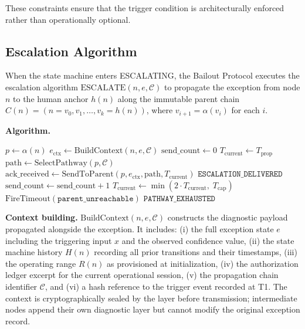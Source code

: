 These constraints ensure that the trigger condition is architecturally enforced rather than operationally optional.

\subsection{Escalation Algorithm}\label{sec:escalation-algorithm}

When the state machine enters ESCALATING, the Bailout Protocol executes the escalation algorithm $\text{ESCALATE}(n, e, \mathcal{C})$ to propagate the exception from node $n$ to the human anchor $h(n)$ along the immutable parent chain $C(n) = (n = v_0, v_1, \ldots, v_k = h(n))$, where $v_{i+1} = \alpha(v_i)$ for each $i$.

\bigskip
\noindent\textbf{Algorithm.}
\begin{algorithmic}
    \State $p \gets \alpha(n)$ 
    \State $e_{\text{ctx}} \gets \text{BuildContext}(n, e, \mathcal{C})$
    \State $\text{send\_count} \gets 0$
    \State $T_{\text{current}} \gets T_{\text{prop}}$ 
        \State $\text{path} \gets \text{SelectPathway}(p, \mathcal{C})$
        \State $\text{ack\_received} \gets \text{SendToParent}(p, e_{\text{ctx}}, \text{path}, T_{\text{current}})$
            \State \Return $\texttt{ESCALATION\_DELIVERED}$
        \EndIf
        \State $\text{send\_count} \gets \text{send\_count} + 1$
        \State $T_{\text{current}} \gets \min(2 \cdot T_{\text{current}},\; T_{\text{cap}})$ 
    \EndWhile
    \State {}
    \State $\text{FireTimeout}(\texttt{parent\_unreachable})$
    \State \Return $\texttt{PATHWAY\_EXHAUSTED}$
\EndFunction
\end{algorithmic}

\bigskip
\noindent\textbf{Context building.} $\text{BuildContext}(n, e, \mathcal{C})$ constructs the diagnostic payload propagated alongside the exception. It includes: (i) the full exception state $e$ including the triggering input $x$ and the observed confidence value, (ii) the state machine history $H(n)$ recording all prior transitions and their timestamps, (iii) the operating range $R(n)$ as provisioned at initialization, (iv) the authorization ledger excerpt for the current operational session, (v) the propagation chain identifier $\mathcal{C}$, and (vi) a hash reference to the trigger event recorded at T1. The context is cryptographically sealed by the \fact{} layer before transmission; intermediate nodes append their own diagnostic layer but cannot modify the original exception record.


